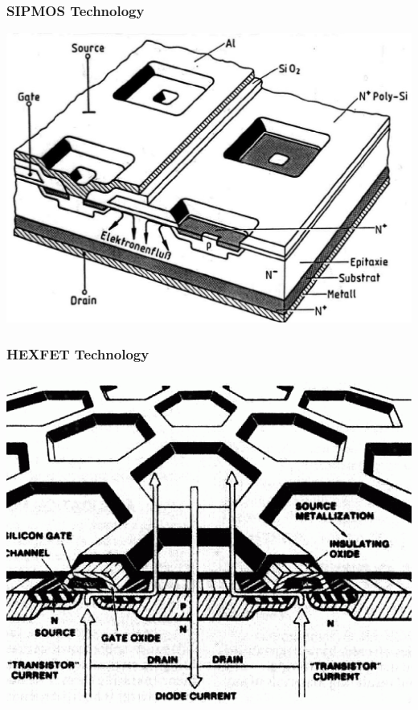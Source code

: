 \documentclass{beamer}
\begin{document}
	\begin{frame}
    \frametitle{SIPMOS Technology}
		\begin{center}
			\includegraphics[scale=0.32]{obr17_sipmos.png} 
		\end{center}
	\end{frame}
	\begin{frame}
    \frametitle{HEXFET Technology}
		\begin{center}
			\includegraphics[scale=0.35]{obr18_hexfet.png} 
		\end{center}
	\end{frame}
\end{document}
